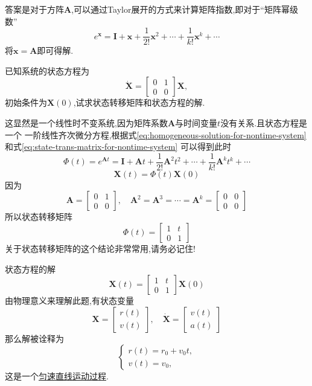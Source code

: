 \documentclass[cn,10pt,citestyle=gb7714-2015,bibstyle=gb7714-2015]{elegantbook}
\begin{document}
答案是对于方阵$\bm{A}$,可以通过\textup{Taylor}展开的方式来计算矩阵指数,即对于“矩阵幂级数”
\begin{equation}
  e^{\bm{x}}=\bm{I}+\bm{x}+\frac{1}{2!}\bm{x}^2+\cdots+\frac{1}{k!}\bm{x}^k+\cdots
\end{equation}
将$\bm{x}=\bm{A}$即可得解.
\begin{example}\label{ex:nontime-system}
  已知系统的状态方程为
  \[
    \dot{\bm{X}}=\begin{bmatrix}
      0&1\\
      0&0
    \end{bmatrix}\bm{X},
  \]  
  初始条件为$\bm{X}(0)$,试求状态转移矩阵和状态方程的解.
\end{example}
\begin{solution}
  这显然是一个线性时不变系统,因为矩阵系数$\bm{A}$与时间变量$t$没有关系.且状态方程是一个
  一阶线性齐次微分方程,根据式\eqref{eq:homogeneous-solution-for-nontime-system}和式\eqref{eq:state-trans-matrix-for-nontime-system}
  可以得到此时
  \begin{equation}\label{eq:State-Trans-Matrix-Taylor-expansion}
    \bm{\varPhi}(t)=e^{\bm{A}t}=\bm{I}+\bm{A}t+\frac{1}{2!}\bm{A}^2t^2+\cdots+\frac{1}{k!}\bm{A}^kt^k+\cdots
  \end{equation}
  \[
      \bm{X}(t)=\bm{\varPhi}(t)\bm{X}(0)
  \]
  因为
  \[
      \bm{A}=\begin{bmatrix}
        0&1\\
        0&0
      \end{bmatrix},\quad
      \bm{A}^2=\bm{A}^3=\cdots=\bm{A}^k=\begin{bmatrix}
        0&0\\
        0&0
      \end{bmatrix}
  \]
  所以状态转移矩阵
  \[
      \bm{\varPhi}(t)=\begin{bmatrix}
        1&t\\
        0&1
      \end{bmatrix}
  \]
  \textcolor{magenta}{\HandRight}关于状态转移矩阵的这个结论非常常用,请务必记住!

  状态方程的解
  \[
      \bm{X}(t)=\begin{bmatrix}
        1&t\\
        0&1
      \end{bmatrix}\bm{X}(0)
  \]
  由物理意义来理解此题,有状态变量
  \[
      \bm{X}=\begin{bmatrix}
        r(t)\\
        v(t)
      \end{bmatrix},\quad\dot{\bm{X}}=\begin{bmatrix}
        v(t)\\
        a(t)
      \end{bmatrix}
  \]
  那么解被诠释为
  \[
      \begin{cases}
        r(t)=r_0+v_0t,\\
        v(t)=v_0,
      \end{cases}
  \]
  这是一个\uline{匀速直线运动过程}.
\end{solution}
\end{document}
